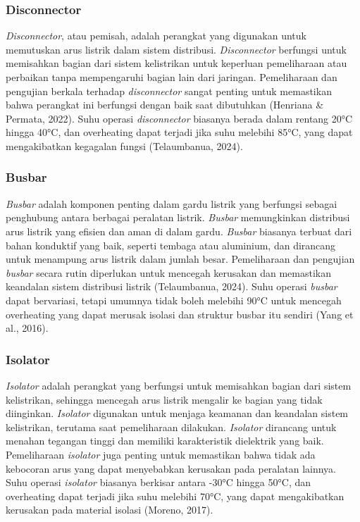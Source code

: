 \subsubsection{Disconnector}
\emph{Disconnector}, atau pemisah, adalah perangkat yang digunakan untuk memutuskan arus listrik dalam sistem distribusi. \emph{Disconnector} berfungsi untuk memisahkan bagian dari sistem kelistrikan untuk keperluan pemeliharaan atau perbaikan tanpa mempengaruhi bagian lain dari jaringan. Pemeliharaan dan pengujian berkala terhadap \emph{disconnector} sangat penting untuk memastikan bahwa perangkat ini berfungsi dengan baik saat dibutuhkan (Henriana & Permata, 2022). Suhu operasi \emph{disconnector} biasanya berada dalam rentang 20°C hingga 40°C, dan overheating dapat terjadi jika suhu melebihi 85°C, yang dapat mengakibatkan kegagalan fungsi (Telaumbanua, 2024).

\subsubsection{Busbar}

\emph{Busbar} adalah komponen penting dalam gardu listrik yang berfungsi sebagai penghubung antara berbagai peralatan listrik. \emph{Busbar} memungkinkan distribusi arus listrik yang efisien dan aman di dalam gardu. \emph{Busbar} biasanya terbuat dari bahan konduktif yang baik, seperti tembaga atau aluminium, dan dirancang untuk menampung arus listrik dalam jumlah besar. Pemeliharaan dan pengujian \emph{busbar} secara rutin diperlukan untuk mencegah kerusakan dan memastikan keandalan sistem distribusi listrik (Telaumbanua, 2024). Suhu operasi \emph{busbar} dapat bervariasi, tetapi umumnya tidak boleh melebihi 90°C untuk mencegah overheating yang dapat merusak isolasi dan struktur busbar itu sendiri (Yang et al., 2016).

\subsubsection{Isolator}

\emph{Isolator} adalah perangkat yang berfungsi untuk memisahkan bagian dari sistem kelistrikan, sehingga mencegah arus listrik mengalir ke bagian yang tidak diinginkan. \emph{Isolator} digunakan untuk menjaga keamanan dan keandalan sistem kelistrikan, terutama saat pemeliharaan dilakukan. \emph{Isolator} dirancang untuk menahan tegangan tinggi dan memiliki karakteristik dielektrik yang baik. Pemeliharaan \emph{isolator} juga penting untuk memastikan bahwa tidak ada kebocoran arus yang dapat menyebabkan kerusakan pada peralatan lainnya. Suhu operasi \emph{isolator} biasanya berkisar antara -30°C hingga 50°C, dan overheating dapat terjadi jika suhu melebihi 70°C, yang dapat mengakibatkan kerusakan pada material isolasi (Moreno, 2017).

